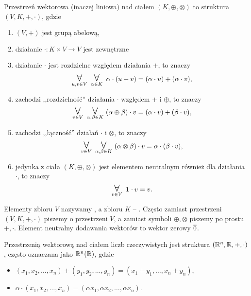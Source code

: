 \begin{definition}
    \label{d:vector_space}
    Przestrzeń wektorowa (inaczej liniowa) nad ciałem $(K, \oplus, \otimes)$ to struktura $(V, K, +, \cdot)$, gdzie
    \begin{enumerate}
        \item $(V, +)$ jest grupą abelową,
        \item działanie $\cdot : K \times V \to V$ jest zewnętrzne
        \item działanie $\cdot$ jest rozdzielne względem działania $+$, to znaczy
            \[ \dforall{u, v \in V} \dforall{\alpha \in K} \alpha\cdot(u + v) = (\alpha \cdot u) + (\alpha \cdot v), \]
        \item zachodzi ,,rozdzielność'' działania $\cdot$ względem $+$ i $\oplus$, to znaczy
            \[ \dforall{v \in V} \dforall{\alpha, \beta \in K} (\alpha \oplus \beta) \cdot v = (\alpha \cdot v) + (\beta \cdot v), \]
        \item zachodzi ,,łączność'' działań $\cdot$ i $\otimes$, to znaczy
            \[ \dforall{v \in V} \dforall{\alpha, \beta \in K} (\alpha \otimes \beta) \cdot v = \alpha \cdot (\beta \cdot v), \]
        \item jedynka z ciała $(K, \oplus, \otimes)$ jest elementem neutralnym również dla działania $\cdot$, to znaczy
            \[ \dforall{v \in V} \mathbf{1} \cdot v = v. \]
    \end{enumerate}
\end{definition}

Elementy zbioru $V$ nazywamy , a zbioru $K$ -- . Często zamiast przestrzeni $(V, K, +, \cdot)$ piszemy o przestrzeni $V$, a zamiast symboli $\oplus, \otimes$ piszemy po prostu $+, \cdot$. Element neutralny dodawania wektorów to wektor zerowy $\overline{0}$.

\begin{example}
    Przestrzenią wektorową nad ciałem liczb rzeczywistych jest struktura $(\mathbb R^n, \mathbb R, +, \cdot)$, często oznaczana jako $\mathbb R^n(\mathbb R)$, gdzie
    \begin{itemize}[noitemsep,nolistsep]
        \item $(x_1, x_2, \ldots, x_n) + (y_1, y_2, \ldots, y_n) = (x_1 + y_1, \ldots, x_n + y_n)$,
        \item $\alpha \cdot (x_1, x_2, \ldots, x_n) = (\alpha x_1, \alpha x_2, \ldots, \alpha x_n)$.
    \end{itemize}
\end{example}

